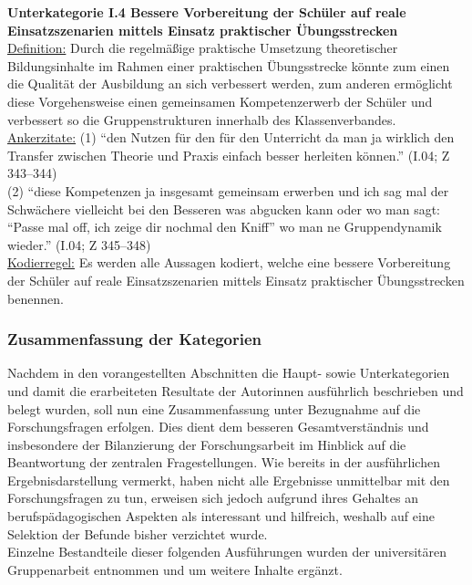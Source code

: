 \noindent
\textbf{Unterkategorie I.4 Bessere Vorbereitung der Schüler auf reale Einsatzszenarien mittels Einsatz praktischer Übungsstrecken}\\
\underline{Definition:} Durch die regelmäßige praktische Umsetzung theoretischer Bildungsinhalte im Rahmen einer praktischen Übungsstrecke könnte zum einen die Qualität der Ausbildung an sich verbessert werden, zum anderen ermöglicht diese Vorgehensweise einen gemeinsamen Kompetenzerwerb der Schüler und verbessert so die Gruppenstrukturen innerhalb des Klassenverbandes.\\
\underline{Ankerzitate:} (1) "`den Nutzen für den für den Unterricht da man ja wirklich den Transfer zwischen Theorie und Praxis einfach besser herleiten können."' (I.04; Z 343--344)\\ (2) "`diese Kompetenzen ja insgesamt gemeinsam erwerben und ich sag mal der Schwächere vielleicht bei den Besseren was abgucken kann oder wo man sagt: "`Passe mal off, ich zeige dir nochmal den Kniff"' wo man ne Gruppendynamik wieder."' (I.04; Z 345--348)\\
\underline{Kodierregel:} Es werden alle Aussagen kodiert, welche eine bessere Vorbereitung der Schüler auf reale Einsatzszenarien mittels Einsatz praktischer Übungsstrecken benennen.

\subsubsection{Zusammenfassung der Kategorien}
\label{sec:ZusammenfassungDerKategorien}

Nachdem in den vorangestellten Abschnitten die Haupt- sowie Unterkategorien und damit die erarbeiteten Resultate der Autorinnen ausführlich beschrieben und belegt wurden, soll nun eine Zusammenfassung unter Bezugnahme auf die Forschungsfragen erfolgen. Dies dient dem besseren Gesamtverständnis und insbesondere der Bilanzierung der Forschungsarbeit im Hinblick auf die Beantwortung der zentralen Fragestellungen. Wie bereits in der ausführlichen Ergebnisdarstellung vermerkt, haben nicht alle Ergebnisse unmittelbar mit den Forschungsfragen zu tun, erweisen sich jedoch aufgrund ihres Gehaltes an berufspädagogischen Aspekten als interessant und hilfreich, weshalb auf eine Selektion der Befunde bisher verzichtet wurde.\\

\noindent
Einzelne Bestandteile dieser folgenden Ausführungen wurden der universitären Gruppenarbeit entnommen und um weitere Inhalte ergänzt.\\

